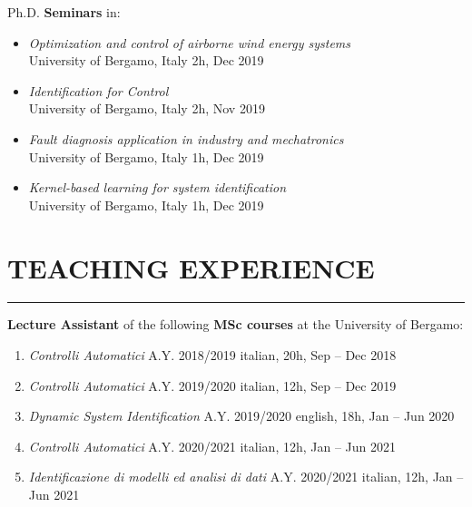 \documentclass[10pt]{article}
\newcommand{\cvsection}[1]{\section*{\centering\normalsize\uppercase{#1}}\vspace{-16pt}\rule{\linewidth}{0.2pt}\vspace{6pt}}
\begin{document}
Ph.D. \textbf{Seminars} in:
\begin{itemize}
	\setlength\itemsep{-3pt}
	\renewcommand\labelitemi{$\vcenter{\hbox{\tiny$\bullet$}}$}
	\item \textit{Optimization and control of airborne wind energy systems}\\
	University of Bergamo, Italy \hfill 2h, Dec 2019\\
	\item \textit{Identification for Control}\\
	University of Bergamo, Italy \hfill 2h, Nov 2019\\
	\item \textit{Fault diagnosis application in industry and mechatronics}\\
	University of Bergamo, Italy \hfill 1h, Dec 2019\\
	\item \textit{Kernel-based learning for system identification}\\
	University of Bergamo, Italy \hfill 1h, Dec 2019\\
\end{itemize}


\cvsection{teaching experience}

\textbf{Lecture Assistant} of the following \textbf{MSc courses} at the University of Bergamo:
\begin{enumerate}
	\setlength\itemsep{-3pt}
	\item \textit{Controlli Automatici} A.Y. 2018/2019 \hfill italian, 20h, Sep – Dec 2018\\
	\item \textit{Controlli Automatici} A.Y. 2019/2020 \hfill italian, 12h, Sep – Dec 2019\\
	\item \textit{Dynamic System Identification} A.Y. 2019/2020 \hfill english, 18h, Jan – Jun 2020\\
	\item \textit{Controlli Automatici} A.Y. 2020/2021 \hfill italian, 12h, Jan – Jun 2021\\
	\item \textit{Identificazione di modelli ed analisi di dati} A.Y. 2020/2021 \hfill italian, 12h, Jan – Jun 2021
\end{enumerate}
\end{document}
